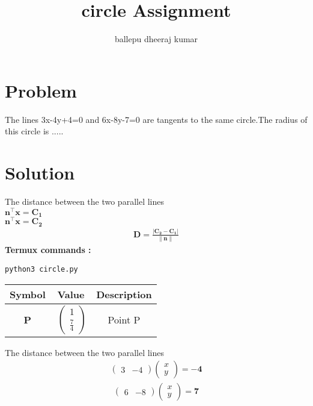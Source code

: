 \documentclass[journal,12pt,twocolumn]{IEEEtran}
\title{circle Assignment}
\author{ballepu dheeraj kumar}
\let\vec\mathbf
\begin{document}
\newcommand{\myvec}[1]{\ensuremath{\begin{pmatrix}#1\end{pmatrix}}}
\providecommand{\norm}[1]{\left\lVert#1\right\rVert}
\maketitle
\begin{tableofcontents}
\section{Problem}
\noindent  The lines 3x-4y+4=0 and 6x-8y-7=0 are tangents to the same circle.The radius of this circle is .....\\

 \section{Solution}
The distance between the two parallel lines \\
$\vec{n}^{\top}\vec{x}=\vec{C_1}$\\
$\vec{n}^{\top}\vec{x}=\vec{C_2}$\\ 
\begin{align}
\vec{D}=\frac{|\vec{C_2}-\vec{C_1}|}{\vec{\norm{n}}}
\end{align}
\vspace{2mm}
\textbf{Termux commands :}
\begin{lstlisting}
python3 circle.py
\end{lstlisting}
\begin{center}
\begin{tabular}{|c|c|c|}
\hline
\textbf{Symbol}&{Value}&{Description}\\
\hline
	\textbf{P}&$\
	\myvec{1 \\ \frac{7}{4}}$
	&Point P\\
	\hline 
\end{tabular}
\end{center}
\vspace{.25 cm}
The distance between the two parallel lines 
\begin{align}
\label{dist_3d_def_eq2}
\myvec{3 &-4}\myvec{x \\ y}=\vec{-4}
\end{align}
\begin{align}
\label{dist_3d_def_eq3}
\myvec{6 &-8}\myvec{x \\ y}=\vec{7}
\end{align}
\begin{align}

\end{align}
\end{tableofcontents}
\end{document}
